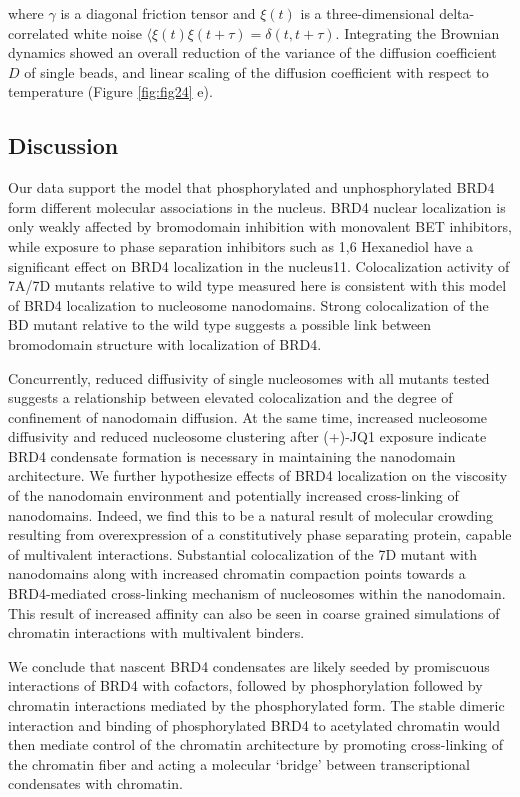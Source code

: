 where $\gamma$ is a diagonal friction tensor and $\xi(t)$ is a three-dimensional delta-correlated white noise $\langle \xi(t)\xi(t+\tau)  = \delta(t,t+\tau)$. Integrating the Brownian dynamics showed an overall reduction of the variance of the diffusion coefficient $D$ of single beads, and linear scaling of the diffusion coefficient with respect to temperature (Figure \ref{fig:fig24} e).

\subsection{Discussion}

Our data support the model that phosphorylated and unphosphorylated BRD4 form different molecular associations in the nucleus. BRD4 nuclear localization is only weakly affected by bromodomain inhibition with monovalent BET inhibitors, while exposure to phase separation inhibitors such as 1,6 Hexanediol have a significant effect on BRD4 localization in the nucleus11. Colocalization activity of 7A/7D mutants relative to wild type measured here is consistent with this model of BRD4 localization to nucleosome nanodomains. Strong colocalization of the BD mutant relative to the wild type suggests a possible link between bromodomain structure with localization of BRD4. 

Concurrently, reduced diffusivity of single nucleosomes with all mutants tested suggests a relationship between elevated colocalization and the degree of confinement of nanodomain diffusion. At the same time, increased nucleosome diffusivity and reduced nucleosome clustering after (+)-JQ1 exposure indicate BRD4 condensate formation is necessary in maintaining the nanodomain architecture. We further hypothesize effects of BRD4 localization on the viscosity of the nanodomain environment and potentially increased cross-linking of nanodomains. Indeed, we find this to be a natural result of molecular crowding resulting from overexpression of a constitutively phase separating protein, capable of multivalent interactions. Substantial colocalization of the 7D mutant with nanodomains along with increased chromatin compaction points towards a BRD4-mediated cross-linking mechanism of nucleosomes within the nanodomain. This result of increased affinity can also be seen in coarse grained simulations of chromatin interactions with multivalent binders.
 
We conclude that nascent BRD4 condensates are likely seeded by promiscuous interactions of BRD4 with cofactors, followed by phosphorylation followed by chromatin interactions mediated by the phosphorylated form. The stable dimeric interaction and binding of phosphorylated BRD4 to acetylated chromatin would then mediate control of the chromatin architecture by promoting cross-linking of the chromatin fiber and acting a molecular ‘bridge’ between transcriptional condensates with chromatin. 



